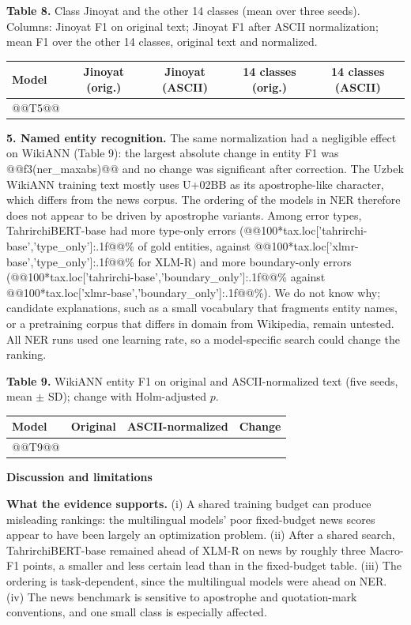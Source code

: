 \documentclass[11pt]{book}
\begin{document}
\begin{center}
\textbf{Table 8.} Class Jinoyat and the other 14 classes (mean over three seeds). Columns: Jinoyat F1 on original text; Jinoyat F1 after ASCII normalization; mean F1 over the other 14 classes, original text and normalized.\\[2pt]
\begin{tabular}{lcccc}
\hline
Model & Jinoyat (orig.) & Jinoyat (ASCII) & 14 classes (orig.) & 14 classes (ASCII) \\
\hline
@@T5@@
\hline
\end{tabular}
\end{center}

\textbf{5. Named entity recognition.} The same normalization had a negligible effect on WikiANN (Table 9): the largest absolute change in entity F1 was @@f3(ner_maxabs)@@ and no change was significant after correction. The Uzbek WikiANN training text mostly uses U+02BB as its apostrophe-like character, which differs from the news corpus. The ordering of the models in NER therefore does not appear to be driven by apostrophe variants. Among error types, TahrirchiBERT-base had more type-only errors (@@100*tax.loc['tahrirchi-base','type_only']:.1f@@\% of gold entities, against @@100*tax.loc['xlmr-base','type_only']:.1f@@\% for XLM-R) and more boundary-only errors (@@100*tax.loc['tahrirchi-base','boundary_only']:.1f@@\% against @@100*tax.loc['xlmr-base','boundary_only']:.1f@@\%). We do not know why; candidate explanations, such as a small vocabulary that fragments entity names, or a pretraining corpus that differs in domain from Wikipedia, remain untested. All NER runs used one learning rate, so a model-specific search could change the ranking.

\begin{center}
\textbf{Table 9.} WikiANN entity F1 on original and ASCII-normalized text (five seeds, mean $\pm$ SD); change with Holm-adjusted $p$.\\[2pt]
\begin{tabular}{lccc}
\hline
Model & Original & ASCII-normalized & Change \\
\hline
@@T9@@
\hline
\end{tabular}
\end{center}

\begin{center}
\textbf{Discussion and limitations}
\end{center}

\textbf{What the evidence supports.} (i) A shared training budget can produce misleading rankings: the multilingual models' poor fixed-budget news scores appear to have been largely an optimization problem. (ii) After a shared search, TahrirchiBERT-base remained ahead of XLM-R on news by roughly three Macro-F1 points, a smaller and less certain lead than in the fixed-budget table. (iii) The ordering is task-dependent, since the multilingual models were ahead on NER. (iv) The news benchmark is sensitive to apostrophe and quotation-mark conventions, and one small class is especially affected.
\end{document}
